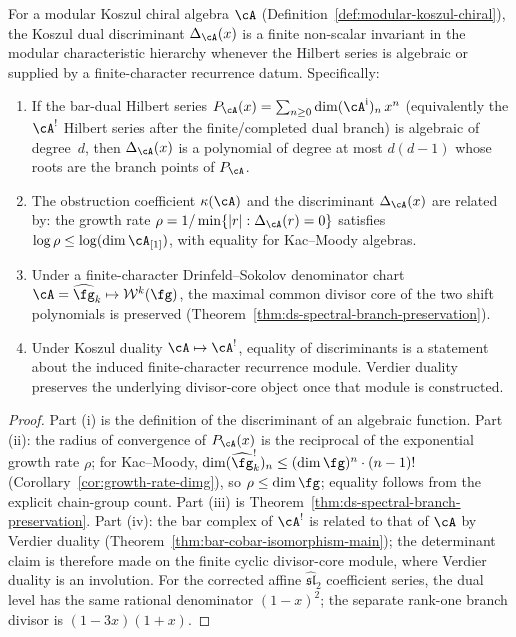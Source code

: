 \begin{proposition}
\label{prop:discriminant-characteristic}
For a modular Koszul chiral algebra $\cA$
\textup{(}Definition~\textup{\ref{def:modular-koszul-chiral})},
the Koszul dual discriminant $\Delta_{\cA}(x)$ is a finite
non-scalar invariant in the modular characteristic hierarchy whenever
the Hilbert series is algebraic or supplied by a finite-character
recurrence datum.
Specifically:
\begin{enumerate}[label=\textup{(\roman*)}]
\item If the bar-dual Hilbert series
 $P_{\cA}(x) = \sum_{n \geq 0} \dim(\cA^{\mathrm i})_n\, x^n$
 \textup{(}equivalently the $\cA^!$ Hilbert series after the
 finite/completed dual branch\textup{)}
 is algebraic of degree~$d$, then $\Delta_{\cA}(x)$ is a polynomial
 of degree at most $d(d-1)$ whose roots are the branch points
 of $P_{\cA}$.
\item The obstruction coefficient $\kappa(\cA)$ and
 the discriminant $\Delta_{\cA}(x)$ are related by: the growth
 rate $\rho = 1/\min\{|r| : \Delta_{\cA}(r) = 0\}$ satisfies
 $\log \rho \leq \log(\dim \cA_{[1]})$, with equality for
 Kac--Moody algebras.
\item Under a finite-character Drinfeld--Sokolov denominator chart
 $\cA = \widehat{\fg}_k \mapsto \mathcal{W}^k(\fg)$, the maximal
 common divisor core of the two shift polynomials is preserved
 \textup{(}Theorem~\textup{\ref{thm:ds-spectral-branch-preservation})}.
\item Under Koszul duality $\cA \mapsto \cA^!$, equality of
 discriminants is a statement about the induced finite-character
 recurrence module.  Verdier duality preserves the underlying
 divisor-core object once that module is constructed.
\end{enumerate}
\end{proposition}

\begin{proof}
Part (i) is the definition of the discriminant of an algebraic function.
Part (ii): the radius of convergence of $P_{\cA}(x)$ is the
reciprocal of the exponential growth rate $\rho$; for Kac--Moody,
$\dim (\widehat{\fg}_k^!)_n \leq (\dim \fg)^n \cdot (n-1)!$
(Corollary~\ref{cor:growth-rate-dimg}), so $\rho \leq \dim \fg$;
equality follows from the explicit chain-group count.
Part (iii) is Theorem~\ref{thm:ds-spectral-branch-preservation}.
Part (iv): the bar complex of $\cA^!$ is related to that of $\cA$
by Verdier duality
(Theorem~\ref{thm:bar-cobar-isomorphism-main}); the determinant claim
is therefore made on the finite cyclic divisor-core module, where
Verdier duality is an involution.  For the corrected affine
$\widehat{\mathfrak{sl}}_2$ coefficient series, the dual level has the
same rational denominator $(1-x)^2$; the separate rank-one branch
divisor is $(1-3x)(1+x)$.
\end{proof}

